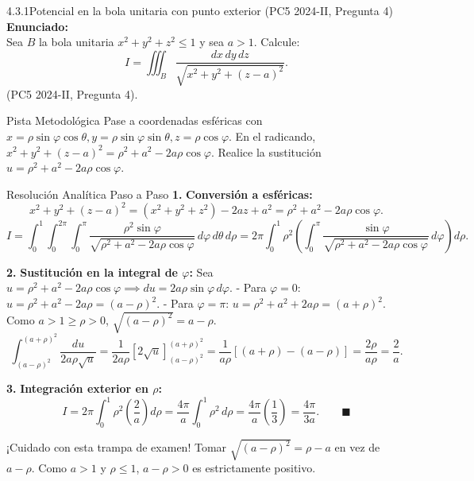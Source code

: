 \documentclass[11pt,a4paper]{article}
\begin{document}
\begin{nivelbox}{4.3.1}{Potencial en la bola unitaria con punto exterior (PC5 2024-II, Pregunta 4)}
\textbf{Enunciado:}\\
Sea $B$ la bola unitaria $x^2 + y^2 + z^2 \le 1$ y sea $a > 1$. Calcule:
\[I = \iiint_B \frac{dx \, dy \, dz}{\sqrt{x^2 + y^2 + (z - a)^2}}.\]
(PC5 2024-II, Pregunta 4).

\begin{observacionbox}{Pista Metodológica}
Pase a coordenadas esféricas con $x = \rho\sin\varphi\cos\theta, y = \rho\sin\varphi\sin\theta, z = \rho\cos\varphi$. En el radicando, $x^2+y^2+(z-a)^2 = \rho^2 + a^2 - 2a\rho\cos\varphi$. Realice la sustitución $u = \rho^2 + a^2 - 2a\rho\cos\varphi$.
\end{observacionbox}

\begin{ejerciciobox}{Resolución Analítica Paso a Paso}
\smallskip\noindent\textbf{1.} \textbf{Conversión a esféricas:}
\[x^2 + y^2 + (z - a)^2 = (x^2+y^2+z^2) - 2az + a^2 = \rho^2 + a^2 - 2a\rho\cos\varphi.\]
\[I = \int_0^1 \int_0^{2\pi} \int_0^\pi \frac{\rho^2 \sin\varphi}{\sqrt{\rho^2 + a^2 - 2a\rho\cos\varphi}} \, d\varphi \, d\theta \, d\rho = 2\pi \int_0^1 \rho^2 \left( \int_0^\pi \frac{\sin\varphi}{\sqrt{\rho^2 + a^2 - 2a\rho\cos\varphi}} \, d\varphi \right) d\rho.\]

\smallskip\noindent\textbf{2.} \textbf{Sustitución en la integral de $\varphi$:}
Sea $u = \rho^2 + a^2 - 2a\rho\cos\varphi \implies du = 2a\rho\sin\varphi \, d\varphi$.
- Para $\varphi = 0$: $u = \rho^2 + a^2 - 2a\rho = (a - \rho)^2$.
- Para $\varphi = \pi$: $u = \rho^2 + a^2 + 2a\rho = (a + \rho)^2$.
Como $a > 1 \ge \rho > 0$, $\sqrt{(a - \rho)^2} = a - \rho$.
\[\int_{(a-\rho)^2}^{(a+\rho)^2} \frac{du}{2a\rho \sqrt{u}} = \frac{1}{2a\rho} [2\sqrt{u}]_{(a-\rho)^2}^{(a+\rho)^2} = \frac{1}{a\rho} [ (a + \rho) - (a - \rho) ] = \frac{2\rho}{a\rho} = \frac{2}{a}.\]

\smallskip\noindent\textbf{3.} \textbf{Integración exterior en $\rho$:}
\[I = 2\pi \int_0^1 \rho^2 \left( \frac{2}{a} \right) d\rho = \frac{4\pi}{a} \int_0^1 \rho^2 \, d\rho = \frac{4\pi}{a} \left( \frac{1}{3} \right) = \frac{4\pi}{3a}. \qquad \blacksquare\]
\end{ejerciciobox}

\begin{errorbox}{¡Cuidado con esta trampa de examen!}
Tomar $\sqrt{(a-\rho)^2} = \rho - a$ en vez de $a - \rho$. Como $a > 1$ y $\rho \le 1$, $a - \rho > 0$ es estrictamente positivo.
\end{errorbox}
\end{nivelbox}
\bigskip
\end{document}

